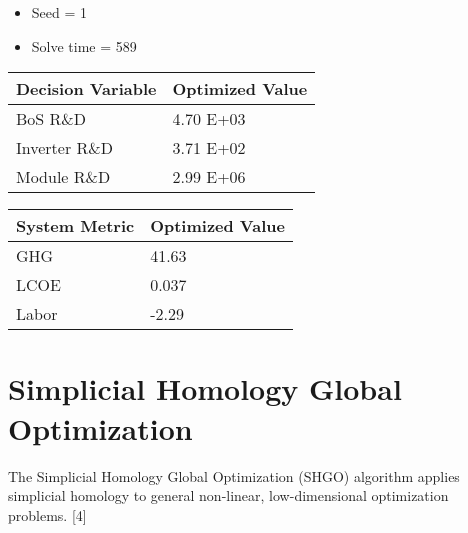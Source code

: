\documentclass[letterpaper,10pt,english]{sphinxmanual}
\begin{document}
\begin{itemize}
\item {} 
Seed = 1

\item {} 
Solve time = 589

\end{itemize}


\begin{savenotes}\sphinxattablestart
\centering
\begin{tabulary}{\linewidth}[t]{|T|T|}
\hline
\sphinxstyletheadfamily 
Decision Variable
&\sphinxstyletheadfamily 
Optimized Value
\\
\hline
BoS R\&D
&
4.70 E+03
\\
\hline
Inverter R\&D
&
3.71 E+02
\\
\hline
Module R\&D
&
2.99 E+06
\\
\hline
\end{tabulary}
\par
\sphinxattableend\end{savenotes}


\begin{savenotes}\sphinxattablestart
\centering
\begin{tabulary}{\linewidth}[t]{|T|T|}
\hline
\sphinxstyletheadfamily 
System Metric
&\sphinxstyletheadfamily 
Optimized Value
\\
\hline
GHG
&
41.63
\\
\hline
LCOE
&
0.037
\\
\hline
Labor
&
-2.29
\\
\hline
\end{tabulary}
\par
\sphinxattableend\end{savenotes}


\section{Simplicial Homology Global Optimization}
\label{\detokenize{doc-src/optimizers:simplicial-homology-global-optimization}}
The Simplicial Homology Global Optimization (SHGO) algorithm applies
simplicial homology to general non-linear, low-dimensional optimization
problems. {[}4{]}

\end{document}
